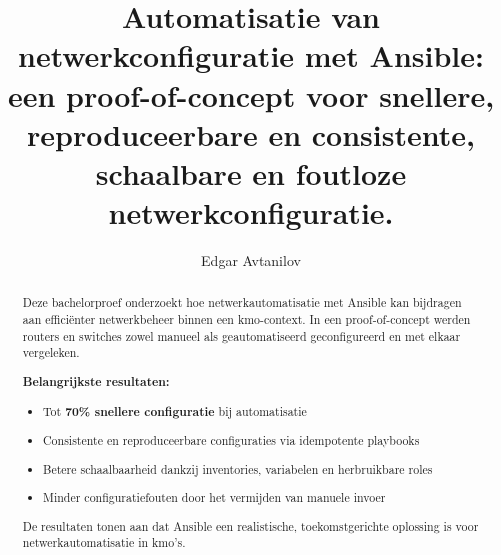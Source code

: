 \documentclass[a0,portrait]{hogent-poster}
\title{Automatisatie van netwerkconfiguratie met Ansible: een proof-of-concept voor snellere, reproduceerbare en consistente, schaalbare en foutloze netwerkconfiguratie.}
\author{Edgar Avtanilov}
\begin{document}
\maketitle

\begin{abstract}
Deze bachelorproef onderzoekt hoe netwerkautomatisatie met Ansible kan bijdragen aan efficiënter netwerkbeheer binnen een kmo-context.
In een proof-of-concept werden routers en switches zowel manueel als geautomatiseerd geconfigureerd en met elkaar vergeleken.

\medskip
\textbf{Belangrijkste resultaten:}
\begin{itemize}
    \item Tot \textbf{70\% snellere configuratie} bij automatisatie
    \item Consistente en reproduceerbare configuraties via idempotente playbooks
    \item Betere schaalbaarheid dankzij inventories, variabelen en herbruikbare roles
    \item Minder configuratiefouten door het vermijden van manuele invoer
\end{itemize}

De resultaten tonen aan dat Ansible een realistische, toekomstgerichte oplossing is voor netwerkautomatisatie in kmo's.
\end{abstract}
\end{document}
